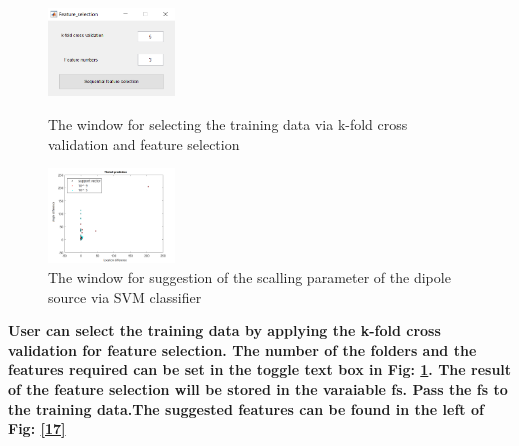 \documentclass[5p]{elsarticle}
\begin{document}
\begin{frontmatter}
\begin{figure}[h!]
  \begin{minipage}
    \begin{center}
    \includegraphics[width=0.3\textwidth]{training_data_preparation.PNG}
  \end{center}
  \caption{The window for selecting the training data via k-fold cross validation and feature selection}
  \end{minipage}
    \begin{minipage}
    \begin{center}
    \includegraphics[width=0.3\textwidth]{SVM_m_theta0_pred.png}
  \end{center}
  \caption{The window for suggestion of the scalling parameter of the dipole source via SVM classifier}
  \end{minipage}
  \label{fig_16}
\end{figure}

\bf User can select the training data by applying the k-fold cross validation for feature selection. The number of the folders and the features required can be set in the toggle text box in Fig: \ref{fig_16}. The result of the feature selection will be stored in the varaiable fs. Pass the fs to the training data.The suggested features can be found in the left of Fig: \ref{17}


\end{frontmatter}
\end{document}
